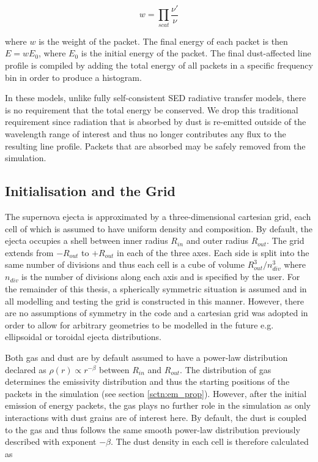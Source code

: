 \begin{equation}
	w=\prod_{scat} \frac{\nu'}{\nu}
\end{equation}

\noindent where $w$ is the weight of the packet.  The final energy of each packet is then $E =w E_0$, where $E_0$ is the initial energy of the packet.  The final dust-affected line profile is compiled by adding the total energy of all packets in a specific frequency bin in order to produce a histogram.
	
	In these models, unlike fully self-consistent SED radiative transfer models, there is no requirement that the total energy be conserved.  We drop this traditional requirement since radiation that is absorbed by dust is re-emitted outside of the wavelength range of interest and thus no longer contributes any flux to the resulting line profile.  Packets that are absorbed may be safely removed from the simulation.
	
	\subsection{Initialisation and the Grid}
	
	The supernova ejecta is approximated by a three-dimensional cartesian grid, each cell of which is assumed to have uniform density and composition.  By default, the ejecta occupies a shell between inner radius $R_{in}$ and outer radius $R_{out}$. The grid extends from $-R_{out}$ to $+R_{out}$ in each of the three axes.  Each side is split into the same number of divisions and thus each cell is a cube of volume $R_{out}^3/n_{div}^3$ where $n_{div}$ is the number of divisions along each axis and is specified by the user.  For the remainder of this thesis, a spherically symmetric situation is assumed and in all modelling and testing the grid is constructed in this manner.  However, there are no assumptions of symmetry in the code and a cartesian grid was adopted in order to allow for arbitrary geometries to be modelled in the future e.g. ellipsoidal or toroidal ejecta distributions.
	
	  Both gas and dust are by default assumed to have a power-law distribution declared as  $\rho(r) \propto r^{-\beta}$ between $R_{in}$ and $R_{out}$.  The distribution of gas determines the emissivity distribution and thus the starting positions of the packets in the simulation (see section \ref{sctn:em_prop}).  However, after the initial emission of energy packets, the gas plays no further role in the simulation as only interactions with dust grains are of interest here.  By default, the dust is coupled to the gas and thus follows the same smooth power-law distribution previously described with exponent $-\beta$.  The dust density in each cell is therefore calculated as
	
